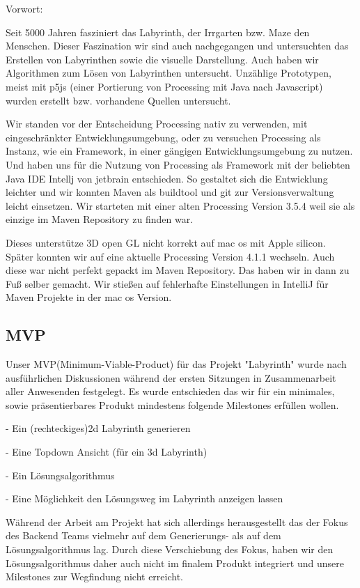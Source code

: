 
Vorwort:

	Seit 5000 Jahren fasziniert das Labyrinth, der Irrgarten bzw. Maze den Menschen. Dieser Faszination wir sind auch nachgegangen und untersuchten das Erstellen von Labyrinthen sowie die visuelle Darstellung. Auch haben wir Algorithmen zum Lösen von Labyrinthen untersucht. Unzählige Prototypen, meist mit p5js (einer Portierung von Processing mit Java nach Javascript)  wurden erstellt bzw.  vorhandene Quellen untersucht.

	Wir standen vor der Entscheidung Processing nativ zu verwenden, mit eingeschränkter Entwicklungsumgebung,  oder zu versuchen Processing als Instanz, wie ein Framework, in einer gängigen Entwicklungsumgebung zu nutzen. Und haben uns für die Nutzung von Processing als Framework mit der beliebten Java IDE Intellj von jetbrain entschieden. So gestaltet sich die Entwicklung leichter und wir konnten Maven als buildtool und git zur Versionsverwaltung leicht einsetzen. Wir starteten mit einer alten Processing Version 3.5.4 weil sie als einzige im Maven Repository zu finden war. 

	Dieses unterstütze 3D open GL nicht korrekt auf mac os mit Apple silicon. Später konnten wir auf eine aktuelle Processing Version 4.1.1 wechseln. Auch diese war nicht perfekt gepackt im Maven Repository. Das haben wir in dann zu Fuß selber gemacht. Wir stießen auf fehlerhafte Einstellungen in IntelliJ für Maven Projekte in der mac os Version.

\subsection{MVP}\label{subsec:mvp}
	Unser MVP(Minimum-Viable-Product) für das Projekt "Labyrinth"  wurde nach ausführlichen Diskussionen während der ersten Sitzungen in Zusammenarbeit aller Anwesenden festgelegt. Es wurde entschieden das wir für ein minimales, sowie präsentierbares Produkt mindestens folgende Milestones erfüllen wollen.
	
	- Ein (rechteckiges)2d Labyrinth generieren
	
	- Eine Topdown Ansicht (für ein 3d Labyrinth)
		
	- Ein Lösungsalgorithmus
	
	- Eine Möglichkeit den Lösungsweg im Labyrinth anzeigen lassen
		
	Während der Arbeit am Projekt hat sich allerdings herausgestellt das der Fokus des Backend Teams vielmehr auf dem Generierungs- als auf dem Lösungsalgorithmus lag. Durch diese Verschiebung des Fokus, haben wir den Lösungsalgorithmus daher auch nicht im finalem Produkt integriert und unsere Milestones zur Wegfindung nicht erreicht.
	
